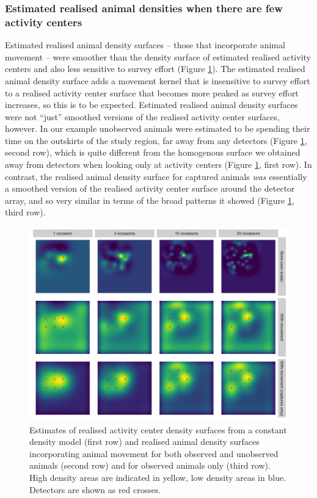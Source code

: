 \documentclass[a4paper,12pt]{article}
\begin{document}
\subsubsection{Estimated realised animal densities when there are few activity centers}

Estimated realised animal density surfaces -- those that incorporate animal movement -- were smoother than the density surface of estimated realised activity centers and also less sensitive to survey effort (Figure \ref{move}). The estimated realised animal density surface adds a movement kernel that is insensitive to survey effort to a realised activity center surface that becomes more peaked as survey effort increases, so this is to be expected. Estimated realised animal density surfaces were not ``just'' smoothed versions of the realised activity center surfaces, however. In our example unobserved animals were estimated to be spending their time on the outskirts of the study region, far away from any detectors (Figure \ref{move}, second row), which is quite different from the homogenous surface we obtained away from detectors when looking only at activity centers (Figure \ref{move}, first row). In contrast, the realised animal density surface for captured animals {\it was} essentially a smoothed version of the realised activity center surface around the detector array, and so very similar in terms of the broad patterns it showed (Figure \ref{move}, third row).

\begin{figure}[htbp]
\centering
\includegraphics[width=1\textwidth]{mona_with_movement.png}
\caption{Estimates of realised activity center density surfaces from a constant density model (first row) and realised animal density surfaces incorporating animal movement for both observed and unobserved animals (second row) and for observed animals only (third row). High density areas are indicated in yellow, low density areas in blue. Detectors are shown as red crosses.}
\label{move}
\end{figure}
\end{document}
